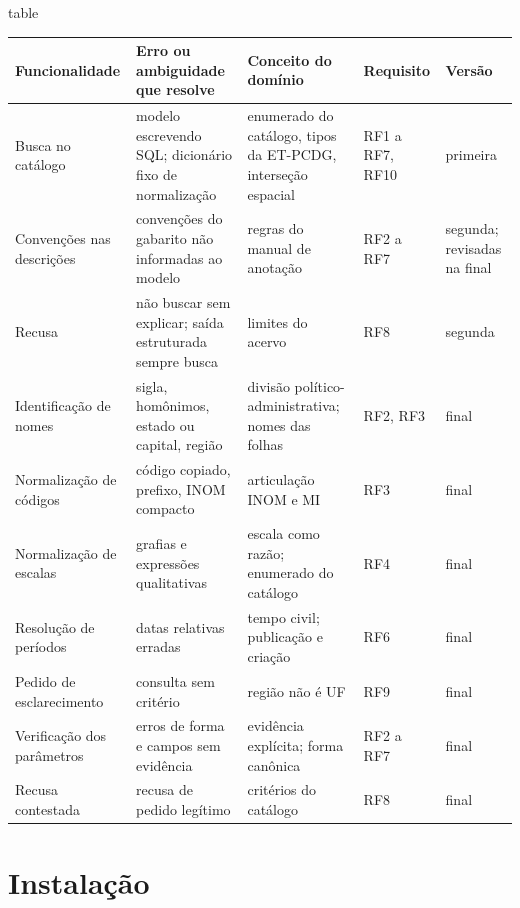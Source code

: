 \begin{fixo}{table}
\centering
\caption{Funcionalidades da busca, erro ou ambiguidade que resolvem, conceito, requisito e versão}
\label{tab:funcionalidades}
\footnotesize
\begin{tabular}{|>{\raggedright\arraybackslash}p{2.9cm}|>{\raggedright\arraybackslash}p{4.0cm}|>{\raggedright\arraybackslash}p{3.6cm}|>{\raggedright\arraybackslash}p{1.6cm}|>{\raggedright\arraybackslash}p{1.6cm}|}
\hline
\textbf{Funcionalidade} & \textbf{Erro ou ambiguidade que resolve} & \textbf{Conceito do domínio} & \textbf{Re\-qui\-si\-to} & \textbf{Versão} \\ \hline
Busca no catálogo & modelo escrevendo SQL; dicionário fixo de normalização & enumerado do catálogo, tipos da ET-PCDG, interseção espacial & RF1 a RF7, RF10 & primeira \\ \hline
Convenções nas descrições & convenções do gabarito não informadas ao modelo & regras do manual de anotação & RF2 a RF7 & segunda; revisadas na final \\ \hline
Recusa & não buscar sem explicar; saída estruturada sempre busca & limites do acervo & RF8 & segunda \\ \hline
Identificação de nomes & sigla, homônimos, estado ou capital, região & divisão político-administrativa; nomes das folhas & RF2, RF3 & final \\ \hline
Normalização de códigos & código copiado, prefixo, INOM compacto & articulação INOM e MI & RF3 & final \\ \hline
Normalização de escalas & grafias e expressões qualitativas & escala como razão; enumerado do catálogo & RF4 & final \\ \hline
Resolução de períodos & datas relativas erradas & tempo civil; publicação e criação & RF6 & final \\ \hline
Pedido de esclarecimento & consulta sem critério & região não é UF & RF9 & final \\ \hline
Verificação dos parâmetros & erros de forma e campos sem evidência & evidência explícita; forma canônica & RF2 a RF7 & final \\ \hline
Recusa contestada & recusa de pedido legítimo & critérios do catálogo & RF8 & final \\ \hline
\end{tabular}
\end{fixo}

\section{Instalação}
\label{sec:res-instalacao}

